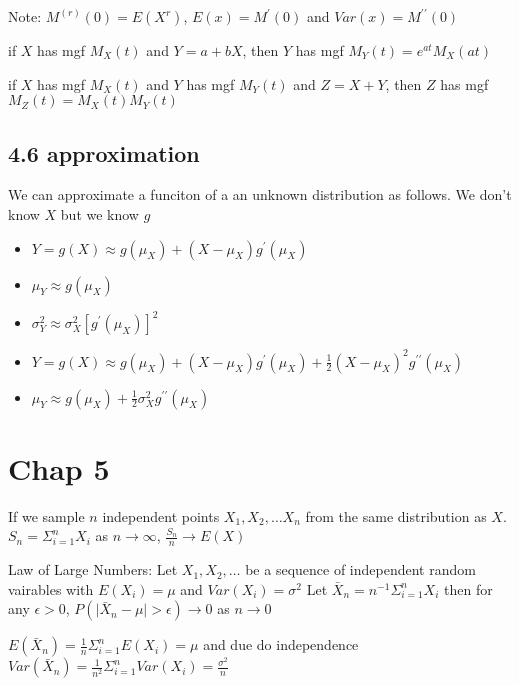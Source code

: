 \documentclass{article}
\begin{document}
\begin{multicols*}{3}
    Note: $M^{\left( r \right)} \left( 0 \right)= E\left(X^r\right)$, $E(x) = M^\prime(0)$ and
    $Var(x) = M^{\prime \prime}(0)$

    if $X$ has mgf $M_X\left( t \right)$ and $Y=a+bX$, then $Y$ has mgf $M_Y\left(t\right) = e^{at} M_X\left( at \right)$

    if $X$ has mgf $M_X\left( t \right)$ and $Y$ has mgf $M_Y\left( t \right)$ and $Z=X+Y$, then $Z$ has mgf $M_Z\left(t\right) = M_X\left(t\right) M_Y\left(t\right)$

    \subsection{4.6 approximation}
    We can approximate a funciton of a an unknown distribution as follows. We don't know $X$ but we know $g$
    \begin{itemize}
        \item $Y = g\left( X \right) \approx g\left( \mu_X \right) + \left( X -\mu_X \right) g^\prime \left( \mu_X\right)$
        \item $\mu_Y \approx g\left( \mu_X \right)$
        \item $\sigma_Y^2 \approx \sigma_X^2 \left[ g^\prime \left( \mu_X\right) \right]^2$
        \item $Y = g\left( X \right) \approx g\left( \mu_X \right) + \left( X -\mu_X \right) g^\prime \left( \mu_X\right) + \frac{1}{2} \left(X - \mu_X \right)^2g^{\prime \prime} \left(\mu_X\right)$
        \item $\mu_Y \approx g\left( \mu_X \right)+ \frac{1}{2} \sigma_X^2g^{\prime \prime} \left(\mu_X\right)$
    \end{itemize}

    \section{Chap 5}
    If we sample $n$ independent points $X_1, X_2, \dots X_n$ from the same distribution as $X$.
    $S_n = \Sigma_{i=1}^n X_i$ as $n\rightarrow \infty$, $\frac{S_n}{n} \rightarrow E\left( X \right)$

    Law of Large Numbers: Let $X_1, X_2, \dots$ be a sequence of independent random vairables with $E\left(X_i\right) = \mu$ and $Var\left(X_i\right) = \sigma^2$
    Let $\bar{X}_n = n^{-1}\Sigma_{i=1}^nX_i$ then for any $\epsilon > 0$, $P\left( \vert \bar{X}_n - \mu\vert > \epsilon \right) \rightarrow 0$ as $n \rightarrow 0$

    $E\left(\bar{X}_n\right) = \frac{1}{n} \Sigma_{i=1}^n E\left(X_i\right) = \mu$ and due do independence $Var\left( \bar{X}_n \right) = \frac{1}{n^2} \Sigma_{i=1}^n Var(X_i) = \frac{\sigma^2}{n}$


\end{multicols*}
\end{document}
